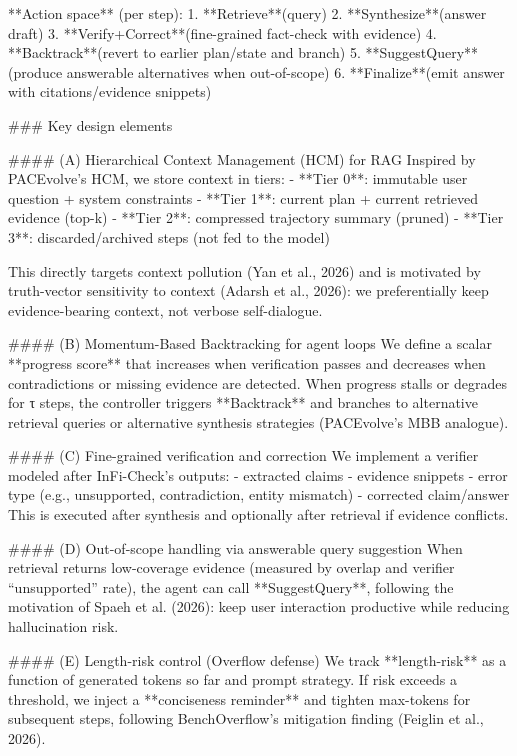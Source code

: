 **Action space** (per step):  
1. **Retrieve**(query)  
2. **Synthesize**(answer draft)  
3. **Verify+Correct**(fine-grained fact-check with evidence)  
4. **Backtrack**(revert to earlier plan/state and branch)  
5. **SuggestQuery**(produce answerable alternatives when out-of-scope)  
6. **Finalize**(emit answer with citations/evidence snippets)

### Key design elements  

#### (A) Hierarchical Context Management (HCM) for RAG  
Inspired by PACEvolve’s HCM, we store context in tiers:  
- **Tier 0**: immutable user question + system constraints  
- **Tier 1**: current plan + current retrieved evidence (top-k)  
- **Tier 2**: compressed trajectory summary (pruned)  
- **Tier 3**: discarded/archived steps (not fed to the model)

This directly targets context pollution (Yan et al., 2026) and is motivated by truth-vector sensitivity to context (Adarsh et al., 2026): we preferentially keep evidence-bearing context, not verbose self-dialogue.

#### (B) Momentum-Based Backtracking for agent loops  
We define a scalar **progress score** that increases when verification passes and decreases when contradictions or missing evidence are detected. When progress stalls or degrades for τ steps, the controller triggers **Backtrack** and branches to alternative retrieval queries or alternative synthesis strategies (PACEvolve’s MBB analogue).

#### (C) Fine-grained verification and correction  
We implement a verifier modeled after InFi-Check’s outputs:  
- extracted claims  
- evidence snippets  
- error type (e.g., unsupported, contradiction, entity mismatch)  
- corrected claim/answer  
This is executed after synthesis and optionally after retrieval if evidence conflicts.

#### (D) Out-of-scope handling via answerable query suggestion  
When retrieval returns low-coverage evidence (measured by overlap and verifier “unsupported” rate), the agent can call **SuggestQuery**, following the motivation of Spaeh et al. (2026): keep user interaction productive while reducing hallucination risk.

#### (E) Length-risk control (Overflow defense)  
We track **length-risk** as a function of generated tokens so far and prompt strategy. If risk exceeds a threshold, we inject a **conciseness reminder** and tighten max-tokens for subsequent steps, following BenchOverflow’s mitigation finding (Feiglin et al., 2026).

